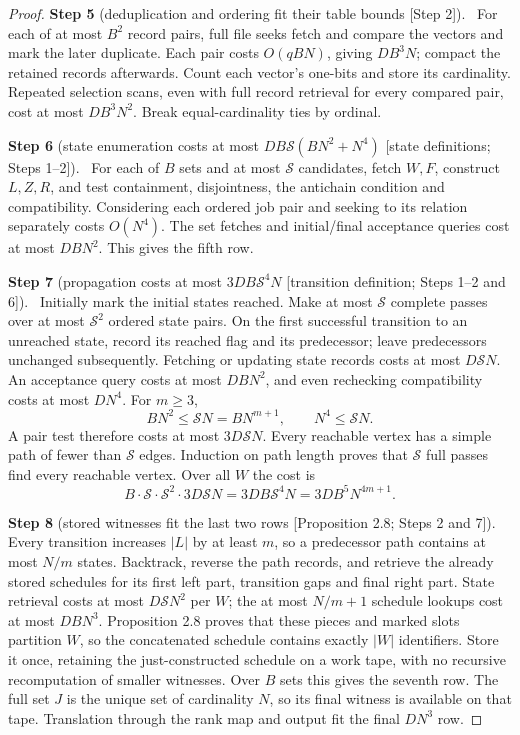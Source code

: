 \documentclass[11pt,a4paper]{article}
\theoremstyle{plain}
\theoremstyle{definition}
\newcommand{\step}[2]{\par\smallskip\noindent\textbf{Step #1} (#2).\ \ignorespaces}
\begin{document}
\begin{proof}
\step{5}{deduplication and ordering fit their table bounds [Step 2]}
For each of at most $B^2$ record pairs, full file seeks fetch and compare
the vectors and mark the later duplicate. Each pair costs $O(qBN)$,
giving $DB^3N$; compact the retained records afterwards. Count each
vector's one-bits and store its cardinality. Repeated selection scans,
even with full record retrieval for every compared pair, cost at most
$DB^3N^2$. Break equal-cardinality ties by ordinal.

\step{6}{state enumeration costs at most $DB\mathcal{S}(BN^2+N^4)$ [state definitions; Steps 1--2]}
For each of $B$ sets and at most $\mathcal{S}$ candidates, fetch $W,F$, construct
$L,Z,R$, and test containment, disjointness, the antichain condition and
compatibility. Considering each ordered job pair and seeking to its
relation separately costs $O(N^4)$. The set fetches and initial/final
acceptance queries cost at most $DBN^2$. This gives the fifth row.

\step{7}{propagation costs at most $3DB\mathcal{S}^4N$ [transition definition; Steps 1--2 and 6]}
Initially mark the initial states reached. Make at most $\mathcal{S}$ complete
passes over at most $\mathcal{S}^2$ ordered state pairs. On the first successful
transition to an unreached state, record its reached flag and its
predecessor; leave predecessors unchanged subsequently. Fetching or
updating state records costs at most $D\mathcal{S}N$. An acceptance query costs
at most $DBN^2$, and even rechecking compatibility costs at most $DN^4$.
For $m\geq3$,
\[
 BN^2\leq \mathcal{S}N=BN^{m+1},\qquad N^4\leq \mathcal{S}N.
\]
A pair test therefore costs at most $3D\mathcal{S}N$. Every reachable vertex has
a simple path of fewer than $\mathcal{S}$ edges. Induction on path length proves
that $\mathcal{S}$ full passes find every reachable vertex. Over all $W$ the cost
is
\[
 B\cdot \mathcal{S}\cdot \mathcal{S}^2\cdot3D\mathcal{S}N
   =3DB\mathcal{S}^4N=3DB^5N^{4m+1}.\tag{9.3}
\]

\step{8}{stored witnesses fit the last two rows [Proposition 2.8; Steps 2 and 7]}
Every transition increases $|L|$ by at least $m$, so a predecessor path
contains at most $N/m$ states. Backtrack, reverse the path records, and
retrieve the already stored schedules for its first left part,
transition gaps and final right part. State retrieval costs at most
$D\mathcal{S}N^2$ per $W$; the at most $N/m+1$ schedule lookups cost at most
$DBN^3$. Proposition 2.8 proves that these pieces and marked slots
partition $W$, so the concatenated schedule contains exactly $|W|$
identifiers. Store it once, retaining the just-constructed schedule on a work tape,
with no recursive recomputation of smaller witnesses. Over $B$ sets this
gives the seventh row. The full set $J$ is the unique set of cardinality
$N$, so its final witness is available on that tape. Translation through
the rank map and output fit the final $DN^3$ row.


\end{proof}
\end{document}
